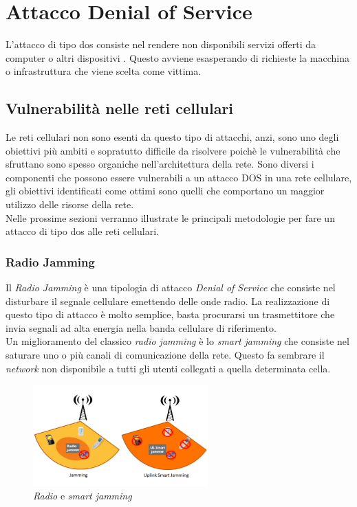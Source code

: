 \chapter{Attacco Denial of Service}
L'attacco di tipo \gls{dos} consiste nel rendere non disponibili servizi offerti da computer o altri
dispositivi \cite{dos-definition}. Questo avviene esasperando di richieste la macchina o infrastruttura che viene scelta come
vittima.

\section{Vulnerabilità nelle reti cellulari}
Le reti cellulari non sono esenti da questo tipo di attacchi, anzi, sono uno degli obiettivi più ambiti e sopratutto difficile da risolvere
poichè le vulnerabilità che sfruttano sono spesso organiche nell'architettura della rete.
Sono diversi i componenti che possono essere vulnerabili a un attacco DOS in una rete cellulare, gli obiettivi identificati come ottimi sono quelli
che comportano un maggior utilizzo delle risorse della rete.\\
Nelle prossime sezioni verranno illustrate le principali metodologie per fare un attacco di tipo \gls{dos} alle reti cellulari\cite{4g-dos-recap}.

\clearpage

\subsection{Radio Jamming}
Il \textit{Radio Jamming} è una tipologia di attacco \textit{Denial of Service} che consiste nel disturbare il segnale cellulare emettendo delle onde radio.
La realizzazione di questo tipo di attacco è molto semplice, basta procurarsi un trasmettitore che invia segnali ad alta energia nella banda cellulare di riferimento.\\
Un miglioramento del classico \textit{radio jamming} è lo \textit{smart jamming} che consiste nel saturare uno o più canali di comunicazione della rete. Questo fa sembrare 
il \textit{network} non disponibile a tutti gli utenti collegati a quella determinata cella.
\begin{figure}[h]
    \centering
    \includegraphics[width=0.6\textwidth]{images/dos-jamming.png}
    \caption{\textit{Radio} e \textit{smart jamming}\cite{4g-dos-recap}}
\end{figure}\\

